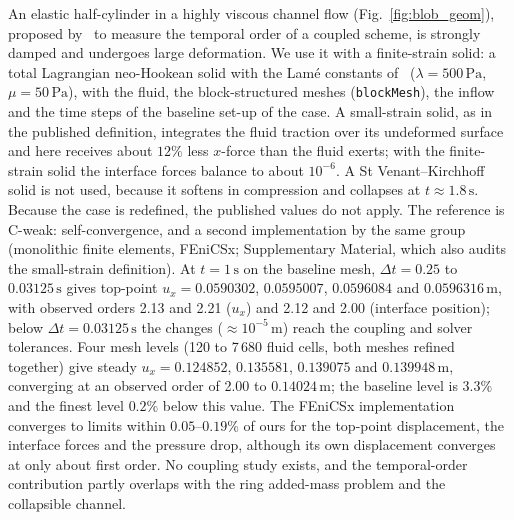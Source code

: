 An elastic half-cylinder in a highly viscous channel flow (Fig.~\ref{fig:blob_geom}), proposed by~\citet{Liu2014} to measure the temporal order of a coupled scheme, is strongly damped and undergoes large deformation.
We use it with a finite-strain solid: a total Lagrangian neo-Hookean solid with the Lam\'e constants of~\citet{Liu2014} ($\lambda = 500\,\mathrm{Pa}$, $\mu = 50\,\mathrm{Pa}$), with the fluid, the block-structured meshes (\texttt{blockMesh}), the inflow and the time steps of the baseline set-up of the case.
A small-strain solid, as in the published definition, integrates the fluid traction over its undeformed surface and here receives about $12\%$ less $x$-force than the fluid exerts; with the finite-strain solid the interface forces balance to about $10^{-6}$. A St Venant--Kirchhoff solid is not used, because it softens in compression and collapses at $t \approx 1.8\,\mathrm{s}$.
Because the case is redefined, the published values do not apply. The reference is C-weak: self-convergence, and a second implementation by the same group (monolithic finite elements, FEniCSx; Supplementary Material, which also audits the small-strain definition).
At $t = 1\,\mathrm{s}$ on the baseline mesh, $\Delta t = 0.25$ to $0.03125\,\mathrm{s}$ gives top-point $u_x = 0.0590302$, $0.0595007$, $0.0596084$ and $0.0596316\,\mathrm{m}$, with observed orders 2.13 and 2.21 ($u_x$) and 2.12 and 2.00 (interface position); below $\Delta t = 0.03125\,\mathrm{s}$ the changes ($\approx10^{-5}\,\mathrm{m}$) reach the coupling and solver tolerances.
Four mesh levels (120 to 7\,680 fluid cells, both meshes refined together) give steady $u_x = 0.124852$, $0.135581$, $0.139075$ and $0.139948\,\mathrm{m}$, converging at an observed order of 2.00 to $0.14024\,\mathrm{m}$; the baseline level is $3.3\%$ and the finest level $0.2\%$ below this value.
The FEniCSx implementation converges to limits within $0.05$--$0.19\%$ of ours for the top-point displacement, the interface forces and the pressure drop, although its own displacement converges at only about first order.
No coupling study exists, and the temporal-order contribution partly overlaps with the ring added-mass problem and the collapsible channel.
